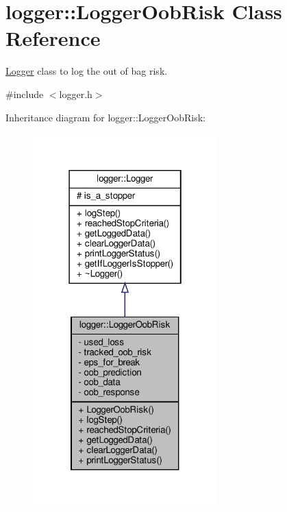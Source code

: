 \hypertarget{classlogger_1_1_logger_oob_risk}{}\section{logger\+:\+:Logger\+Oob\+Risk Class Reference}
\label{classlogger_1_1_logger_oob_risk}


\hyperlink{classlogger_1_1_logger}{Logger} class to log the out of bag risk.  




{\ttfamily \#include $<$logger.\+h$>$}



Inheritance diagram for logger\+:\+:Logger\+Oob\+Risk\+:
\nopagebreak
\begin{figure}[H]
\begin{center}
\leavevmode
\includegraphics[width=202pt]{classlogger_1_1_logger_oob_risk__inherit__graph}
\end{center}
\end{figure}


